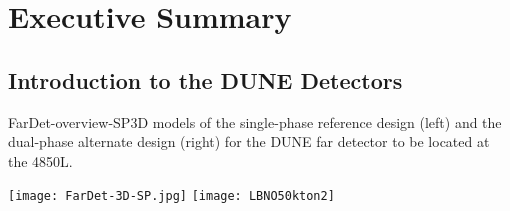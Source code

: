 \chapter{Executive Summary}
\label{ch:detectors-execsumm}



\section{Introduction to the DUNE Detectors}
\label{sec:intro-dune-det}


\begin{cdrfigure}{FarDet-overview-SP}{3D models of the single-phase reference design (left) and the dual-phase alternate design (right) for the DUNE far detector to be located at the 4850L. }
\centering
\begin{minipage}[b]{1.0\textwidth}
\begin{center}
\texttt{[image: FarDet-3D-SP.jpg]}
\texttt{[image: LBNO50kton2]}
\end{center}
\end{minipage}
\end{cdrfigure}
